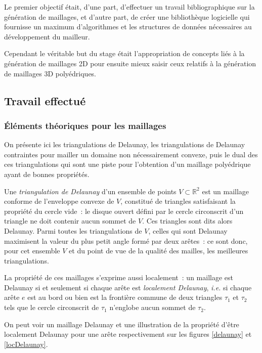 \documentclass[12pt,a4paper]{report}
\begin{document}
Le premier objectif était, d'une part, d'effectuer un travail bibliographique sur la génération de maillages, et d'autre part, de créer une bibliothèque logicielle qui fournisse un maximum d'algorithmes et les structures de données nécessaires au développement du mailleur.

Cependant le véritable but du stage était l'appropriation de concepts liés à la génération de maillages 2D pour ensuite mieux saisir ceux relatifs à la génération de maillages 3D polyédriques.

\subsection{Travail effectué}

\subsubsection{\'Eléments théoriques pour les maillages}

On présente ici les triangulations de Delaunay, les triangulations de Delaunay contraintes pour mailler un domaine non nécessairement convexe, puis le dual des ces triangulations qui sont une piste pour l'obtention d'un maillage polyédrique ayant de bonnes propriétés.
\vspace{1cm}

Une \emph{triangulation de Delaunay} d'un ensemble de points $V\subset\mathbb{R}^2$ est un maillage conforme de l'enveloppe convexe de $V$, constitué de triangles satisfaisant la propriété du cercle vide~: le disque ouvert défini par le cercle circonscrit d'un triangle ne doit contenir aucun sommet de $V$. Ces triangles sont dits alors Delaunay. Parmi toutes les triangulations de $V$, celles qui sont Delaunay maximisent la valeur du plus petit angle formé par deux arêtes~: ce sont donc, pour cet ensemble $V$ et du point de vue de la qualité des mailles, les \og meilleures \fg{} triangulations.

La propriété de ces maillages s'exprime aussi localement~: un maillage est Delaunay si et seulement si chaque arête est \emph{localement Delaunay}, \emph{i.e.} si chaque arête $e$ est au bord ou bien est la frontière commune de deux triangles $\tau_1$ et $\tau_2$ tels que le cercle circonscrit de $\tau_1$ n'englobe aucun sommet de $\tau_2$.

On peut voir un maillage Delaunay et une illustration de la propriété d'être localement Delaunay pour une arête respectivement sur les figures \ref{delaunay} et \ref{locDelaunay}.
\end{document}
